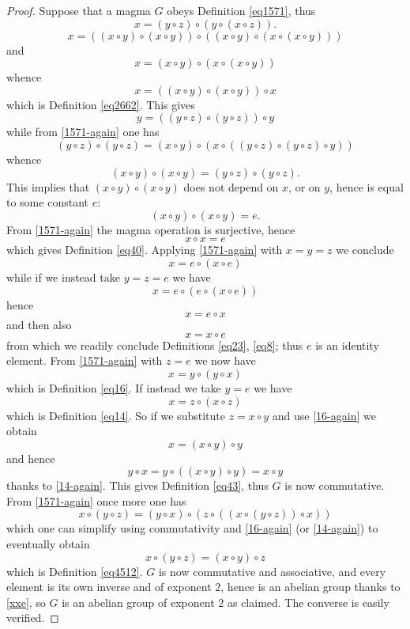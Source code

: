 \begin{proof}\leanok  Suppose that a magma $G$ obeys Definition \ref{eq1571}, thus
\begin{equation}\label{1571-again}
 x = (y \circ z) \circ (y \circ (x \circ z)).
\end{equation}
$$ x = ((x \circ y) \circ (x \circ y)) \circ ((x \circ y) \circ (x \circ (x \circ y)))$$
and
$$ x = (x \circ y) \circ (x \circ (x \circ y))$$
whence
$$x = ((x \circ y) \circ (x \circ y)) \circ x$$
which is Definition \ref{eq2662}.  This gives
$$y = ((y \circ z) \circ (y \circ z)) \circ y$$
while from \eqref{1571-again} one has
$$ (y \circ z) \circ (y \circ z) = (x \circ y) \circ (x \circ ((y \circ z) \circ (y \circ z) \circ y))$$
whence
$$ (x \circ y) \circ (x \circ y) = (y \circ z) \circ (y \circ z).$$
This implies that $(x \circ y) \circ (x \circ y)$ does not depend on $x$, or on $y$, hence is equal to some constant $e$:
$$ (x \circ y) \circ (x \circ y) = e.$$
From \eqref{1571-again} the magma operation is surjective, hence
\begin{equation}\label{xxe} x \circ x = e
\end{equation}
which gives Definition \ref{eq40}.  Applying \eqref{1571-again} with $x=y=z$ we conclude
$$ x = e \circ (x \circ e)$$
while if we instead take $y=z=e$ we have
$$ x = e \circ (e \circ (x \circ e))$$
hence
$$ x = e \circ x$$
and then also
$$ x = x \circ e$$
from which we readily conclude Definitions \ref{eq23}, \ref{eq8}; thus $e$ is an identity element.  From \eqref{1571-again} with $z=e$ we now have
\begin{equation}\label{16-again}
 x = y \circ (y \circ x)
\end{equation}
which is Definition \ref{eq16}. If instead we take $y=e$ we have
\begin{equation}\label{14-again}
  x = z \circ (x \circ z)
\end{equation}
which is Definition \ref{eq14}.  So if we substitute $z = x \circ y$ and use \eqref{16-again} we obtain
$$ x = (x \circ y) \circ y$$
and hence
$$ y \circ x = y \circ ((x \circ y) \circ y) = x \circ y$$
thanks to \eqref{14-again}.  This gives Definition \ref{eq43}, thus $G$ is now commutative.  From \eqref{1571-again} once more one has
$$x \circ (y \circ z) = (y \circ x) \circ (z \circ ((x \circ (y \circ z)) \circ x))$$
which one can simplify using commutativity and \eqref{16-again} (or \eqref{14-again}) to eventually obtain
$$x \circ (y \circ z) = (x \circ y) \circ z$$
which is Definition \ref{eq4512}.  $G$ is now commutative and associative, and every element is its own inverse and of exponent $2$, hence is an abelian group thanks to \eqref{xxe}, so $G$ is an abelian group of exponent $2$ as claimed.  The converse is easily verified.
\end{proof}
